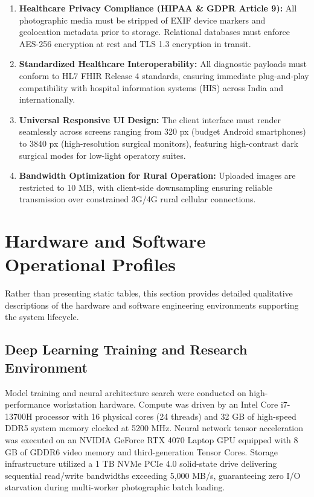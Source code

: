 \documentclass[12pt,a4paper,oneside]{report}
\begin{document}
\begin{enumerate}[label=\textbf{NFR-\arabic*:}]
    \item \textbf{Healthcare Privacy Compliance (HIPAA \& GDPR Article 9):} All photographic media must be stripped of EXIF device markers and geolocation metadata prior to storage. Relational databases must enforce AES-256 encryption at rest and TLS 1.3 encryption in transit.
    
    \item \textbf{Standardized Healthcare Interoperability:} All diagnostic payloads must conform to HL7 FHIR Release 4 standards, ensuring immediate plug-and-play compatibility with hospital information systems (HIS) across India and internationally.
    
    \item \textbf{Universal Responsive UI Design:} The client interface must render seamlessly across screens ranging from 320 px (budget Android smartphones) to 3840 px (high-resolution surgical monitors), featuring high-contrast dark surgical modes for low-light operatory suites.
    
    \item \textbf{Bandwidth Optimization for Rural Operation:} Uploaded images are restricted to 10 MB, with client-side downsampling ensuring reliable transmission over constrained 3G/4G rural cellular connections.
\end{enumerate}

\section{Hardware and Software Operational Profiles}
\label{sec:env_specs}

Rather than presenting static tables, this section provides detailed qualitative descriptions of the hardware and software engineering environments supporting the system lifecycle.

\subsection{Deep Learning Training and Research Environment}
Model training and neural architecture search were conducted on high-performance workstation hardware. Compute was driven by an Intel Core i7-13700H processor with 16 physical cores (24 threads) and 32 GB of high-speed DDR5 system memory clocked at 5200 MHz. Neural network tensor acceleration was executed on an NVIDIA GeForce RTX 4070 Laptop GPU equipped with 8 GB of GDDR6 video memory and third-generation Tensor Cores. Storage infrastructure utilized a 1 TB NVMe PCIe 4.0 solid-state drive delivering sequential read/write bandwidths exceeding 5,000 MB/s, guaranteeing zero I/O starvation during multi-worker photographic batch loading.
\end{document}
